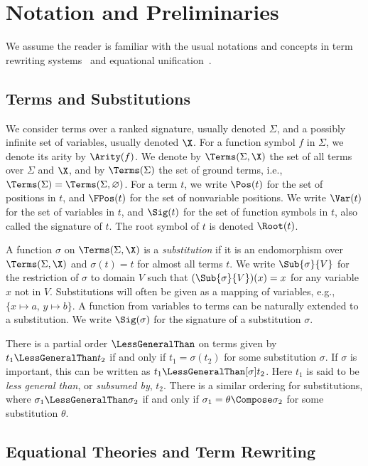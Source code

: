 \chapter{Notation and Preliminaries}\label{chap:prelims}

We assume the reader is familiar with the usual notations and concepts in term
rewriting systems~\cite{Term} and equational unification~\cite{BaaderSnyd-01}.

\section{Terms and Substitutions}\label{sec:terms-subs}

We consider terms over a ranked signature, usually denoted $\Sigma$, and a
possibly infinite set of variables, usually denoted $\X$. For a function symbol
$f$ in $\Sigma$, we denote its arity by $\Arity(f)$. We denote by
$\Terms(\Sigma, \X)$ the set of all terms over $\Sigma$ and $\X$, and by
$\Terms(\Sigma)$ the set of ground terms, i.e., $\Terms(\Sigma) =
\Terms(\Sigma, \varnothing)$. For a term $t$, we write $\Pos(t)$ for the set of
positions in $t$, and $\FPos(t)$ for the set of nonvariable positions. We write
$\Var(t)$ for the set of variables in $t$, and $\Sig(t)$ for the set of
function symbols in $t$, also called the signature of $t$. The root symbol of
$t$ is denoted $\Root(t)$.

A function $\sigma$ on $\Terms(\Sigma, \X)$ is a \emph{substitution} if it is
an endomorphism over $\Terms(\Sigma, \X)$ and $\sigma(t) = t$ for almost all
terms $t$. We write $\Sub{\sigma}{V}$ for the restriction of $\sigma$ to domain
$V$ such that $(\Sub{\sigma}{V})(x) = x$ for any variable $x$ not in $V$.
Substitutions will often be given as a mapping of variables, e.g., $\{ x
\mapsto a,\, y \mapsto b \}$. A function from variables to terms can be
naturally extended to a substitution. We write $\Sig(\sigma)$ for the signature
of a substitution $\sigma$.

There is a partial order $\LessGeneralThan$ on terms given by $t_1
\LessGeneralThan t_2$ if and only if $t_1 = \sigma(t_2)$ for some substitution
$\sigma$. If $\sigma$ is important, this can be written as $t_1
\LessGeneralThan[\sigma] t_2$. Here $t_1$ is said to be \emph{less general
than}, or \emph{subsumed by}, $t_2$. There is a similar ordering for
substitutions, where $\sigma_1 \LessGeneralThan \sigma_2$ if and only if
$\sigma_1 = \theta \Compose \sigma_2$ for some substitution $\theta$.

\section{Equational Theories and Term Rewriting}\label{sec:eq-sys-term-rew}

